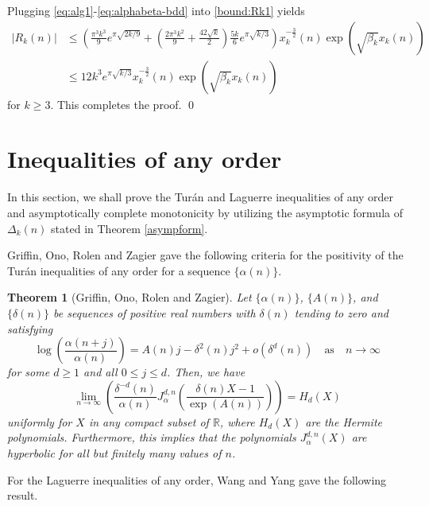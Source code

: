\documentclass[12pt]{article}
\newtheorem{thm}{Theorem}[section]
\numberwithin{equation}{section}
\begin{document}
Plugging \eqref{eq:alg1}-\eqref{eq:alphabeta-bdd} into \eqref{bound:Rk1} yields
\begin{align*}
|R_{k}(n)|
&\leq \left(\frac{\pi^3k^3}{9}e^{\pi\sqrt{2k/9}}
+\left(\frac{2\pi^3k^2}{9}+\frac{42\sqrt{k}}{2}\right)\frac{5k}{6} e^{\pi\sqrt{k/3}}\right)x_{k}^{-\frac{3}{2}}(n)
\exp\left(\sqrt{\beta_k} x_{k}(n) \right)
\\
&\leq 12k^3 e^{\pi\sqrt{k/3}}x_{k}^{-\frac{3}{2}}(n)
\exp\left( \sqrt{\beta_k}x_{k}(n) \right)
\end{align*}
for $k\geq 3$. This completes the proof.
\qed


\section{Inequalities of any order}\label{sec:ineq-any}
In this section, we shall prove the Tur\'an and Laguerre inequalities of any order and asymptotically complete monotonicity by utilizing the asymptotic formula of $\Delta_{k}(n)$ stated in Theorem \ref{asympform}.

Griffin, Ono, Rolen and Zagier \cite{Griffin-Ono-Rolen-Zagier-2019} gave the following criteria for the positivity of the Tur\'an inequalities of any order for a sequence $\{\alpha(n)\}$.

\begin{thm}[Griffin, Ono, Rolen and Zagier]\label{gorz}
Let $\{\alpha(n)\}$, $\{A(n)\}$, and $\{\delta(n)\}$ be sequences of positive real numbers with $\delta(n)$ tending to zero and satisfying
\[
\log \left(\frac{\alpha(n+j)}{\alpha(n)}\right)=A(n)j-\delta^2(n)j^2
+o\left(\delta^d(n)\right) \quad \mbox{as}\quad n\rightarrow \infty
\]
for some $d\geq1$ and all $0\leq j\leq d$. Then, we have
\[
\lim_{n\rightarrow \infty}\left(\frac{\delta^{-d}(n)}{\alpha(n)}J_{\alpha}^{d,n}\left(\frac{\delta(n)X-1}{\exp
(A(n))}\right)\right)=H_d(X)
\]
uniformly for $X$ in any compact subset of $\mathbb{R}$, where $H_d(X)$ are the Hermite polynomials. Furthermore, this
implies that the polynomials $J_{\alpha}^{d,n}(X)$ are hyperbolic for all but finitely many values of $n$.
\end{thm}
For the Laguerre inequalities of any order, Wang and Yang \cite{Wang-Yang-2024} gave the following result.
\end{document}
